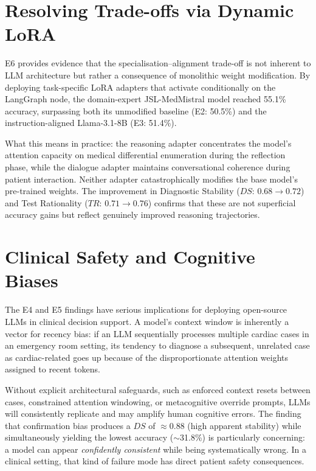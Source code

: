 \section{Resolving Trade-offs via Dynamic LoRA}

E6 provides evidence that the specialisation--alignment trade-off is not inherent to LLM architecture but rather a consequence of monolithic weight modification. By deploying task-specific LoRA adapters that activate conditionally on the LangGraph node, the domain-expert JSL-MedMistral model reached 55.1\% accuracy, surpassing both its unmodified baseline (E2: 50.5\%) and the instruction-aligned Llama-3.1-8B (E3: 51.4\%).

What this means in practice: the reasoning adapter concentrates the model's attention capacity on medical differential enumeration during the reflection phase, while the dialogue adapter maintains conversational coherence during patient interaction. Neither adapter catastrophically modifies the base model's pre-trained weights. The improvement in Diagnostic Stability ($DS$: $0.68 \to 0.72$) and Test Rationality ($TR$: $0.71 \to 0.76$) confirms that these are not superficial accuracy gains but reflect genuinely improved reasoning trajectories.

\section{Clinical Safety and Cognitive Biases}

The E4 and E5 findings have serious implications for deploying open-source LLMs in clinical decision support. A model's context window is inherently a vector for recency bias: if an LLM sequentially processes multiple cardiac cases in an emergency room setting, its tendency to diagnose a subsequent, unrelated case as cardiac-related goes up because of the disproportionate attention weights assigned to recent tokens.

Without explicit architectural safeguards, such as enforced context resets between cases, constrained attention windowing, or metacognitive override prompts, LLMs will consistently replicate and may amplify human cognitive errors. The finding that confirmation bias produces a $DS$ of $\approx$0.88 (high apparent stability) while simultaneously yielding the lowest accuracy ($\sim$31.8\%) is particularly concerning: a model can appear \textit{confidently consistent} while being systematically wrong. In a clinical setting, that kind of failure mode has direct patient safety consequences.

